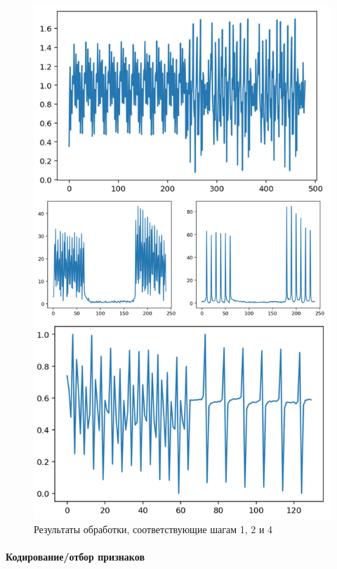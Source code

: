              \begin{figure}[h!]
            \centering
            \includegraphics[scale=0.61]{pictures/preproc.png}
            \caption{Результаты обработки, соответствующие шагам 1, 2 и 4
            }
            \label{fig:my_label}
        \end{figure}
            \par
             
        \newpage
        \paragraph{Кодирование/отбор признаков}
        \noindent 
        
